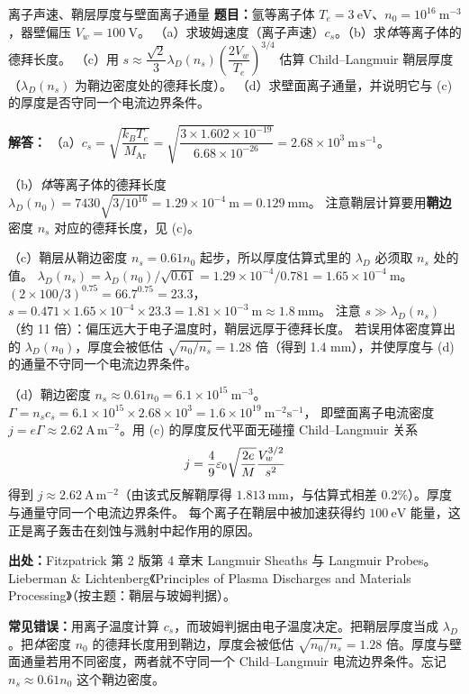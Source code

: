 \begin{example}{离子声速、鞘层厚度与壁面离子通量}{}
\textbf{题目：}氩等离子体 $T_e=3\ \mathrm{eV}$、$n_0=10^{16}\ \mathrm{m^{-3}}$，器壁偏压 $V_w=100\ \mathrm{V}$。
（a）求玻姆速度（离子声速）$c_s$。（b）求\emph{体}等离子体的德拜长度。
（c）用 $s\approx\dfrac{\sqrt2}{3}\lambda_D(n_s)\left(\dfrac{2V_w}{T_e}\right)^{3/4}$ 估算 Child--Langmuir 鞘层厚度（$\lambda_D(n_s)$ 为鞘边密度处的德拜长度）。
（d）求壁面离子通量，并说明它与 (c) 的厚度是否守同一个电流边界条件。

\textbf{解答：}
（a）$c_s=\sqrt{\dfrac{k_BT_e}{M_{\mathrm{Ar}}}}
=\sqrt{\dfrac{3\times1.602\times10^{-19}}{6.68\times10^{-26}}}=2.68\times10^{3}\ \mathrm{m\,s^{-1}}$。

（b）\emph{体}等离子体的德拜长度 $\lambda_D(n_0)=7430\sqrt{3/10^{16}}=1.29\times10^{-4}\ \mathrm{m}=0.129\ \mathrm{mm}$。
注意鞘层计算要用\textbf{鞘边}密度 $n_s$ 对应的德拜长度，见 (c)。

（c）鞘层从鞘边密度 $n_s=0.61n_0$ 起步，所以厚度估算式里的 $\lambda_D$ 必须取 $n_s$ 处的值。
$\lambda_D(n_s)=\lambda_D(n_0)/\sqrt{0.61}=1.29\times10^{-4}/0.781=1.65\times10^{-4}\ \mathrm{m}$。
$(2\times100/3)^{0.75}=66.7^{0.75}=23.3$，
$s=0.471\times1.65\times10^{-4}\times23.3=1.81\times10^{-3}\ \mathrm{m}\approx1.8\ \mathrm{mm}$。
注意 $s\gg\lambda_D(n_s)$（约 11 倍）：偏压远大于电子温度时，鞘层远厚于德拜长度。
若误用体密度算出的 $\lambda_D(n_0)$，厚度会被低估 $\sqrt{n_0/n_s}=1.28$ 倍（得到 1.4 mm），并使厚度与 (d) 的通量不守同一个电流边界条件。

（d）鞘边密度 $n_s\approx0.61n_0=6.1\times10^{15}\ \mathrm{m^{-3}}$。
$\Gamma=n_sc_s=6.1\times10^{15}\times2.68\times10^{3}=1.6\times10^{19}\ \mathrm{m^{-2}s^{-1}}$，
即壁面离子电流密度 $j=e\Gamma\approx2.62\ \mathrm{A\,m^{-2}}$。用 (c) 的厚度反代平面无碰撞 Child--Langmuir 关系
\[
j=\frac49\varepsilon_0\sqrt{\frac{2e}{M}}\frac{V_w^{3/2}}{s^2}
\]
得到 $j\approx2.62\ \mathrm{A\,m^{-2}}$（由该式反解鞘厚得 $1.813\ \mathrm{mm}$，与估算式相差 0.2\%）。厚度与通量守同一个电流边界条件。
每个离子在鞘层中被加速获得约 $100\ \mathrm{eV}$ 能量，这正是离子轰击在刻蚀与溅射中起作用的原因。

{\footnotesize
\textbf{出处：}Fitzpatrick 第 2 版第 4 章末 Langmuir Sheaths 与 Langmuir Probes。
Lieberman \& Lichtenberg《Principles of Plasma Discharges and Materials Processing》（按主题：鞘层与玻姆判据）。
}

\textbf{常见错误：}用离子温度计算 $c_s$，而玻姆判据由电子温度决定。把鞘层厚度当成 $\lambda_D$。把\emph{体}密度 $n_0$ 的德拜长度用到鞘边，厚度会被低估 $\sqrt{n_0/n_s}=1.28$ 倍。厚度与壁面通量若用不同密度，两者就不守同一个 Child--Langmuir 电流边界条件。忘记 $n_s\approx0.61n_0$ 这个鞘边密度。
\end{example}


